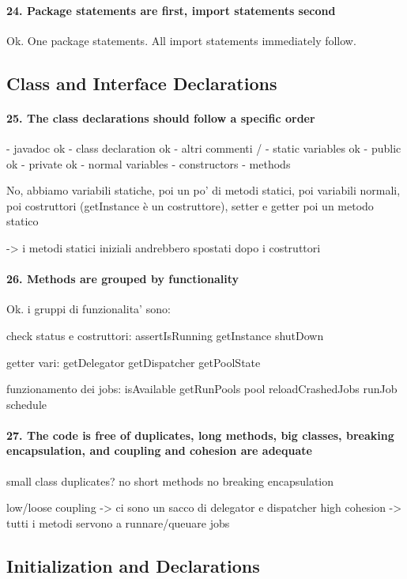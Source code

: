 \documentclass[english]{article}
\begin{document}
\paragraph{24. Package statements are first, import statements second}
Ok.
One package statements.
All import statements immediately follow.

\subsection{Class and Interface Declarations}
\paragraph{25. The class declarations should follow a specific order}
- javadoc ok
- class declaration ok
- altri commenti /
- static variables ok
 - public ok
 - private ok
- normal variables 
- constructors
- methods

No, abbiamo variabili statiche, poi un po' di metodi statici, poi variabili normali, poi costruttori (getInstance è un costruttore), setter e getter poi un metodo statico

-> i metodi statici iniziali andrebbero spostati dopo i costruttori


\paragraph{26. Methods are grouped by functionality}
Ok.
i gruppi di funzionalita' sono:

check status e costruttori:
assertIsRunning
getInstance
shutDown

getter vari:
getDelegator
getDispatcher
getPoolState

funzionamento dei jobs:
isAvailable
getRunPools
pool
reloadCrashedJobs
runJob
schedule

\paragraph{27. The code is free of duplicates, long methods, big classes, breaking encapsulation, and coupling and cohesion are adequate}
small class
duplicates? no
short methods
no breaking encapsulation

low/loose coupling -> ci sono un sacco di delegator e dispatcher
high cohesion -> tutti i metodi servono a runnare/queuare jobs

\subsection{Initialization and Declarations}
\end{document}
